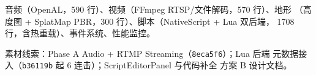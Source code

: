 音频（OpenAL，590 行）、视频（FFmpeg RTSP/文件解码，570 行）、地形
（高度图 + SplatMap PBR，300 行）、脚本（NativeScript + Lua 双后端，
1708 行，含热重载）、事件系统、性能监控。

素材线索：Phase A Audio + RTMP Streaming（\texttt{8eca5f6}）；Lua 后端
元数据接入（\texttt{b36119b} 起 6 连击）；ScriptEditorPanel 与代码补全
方案 B 设计文档。

